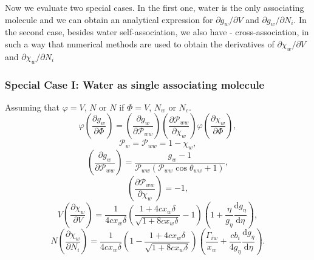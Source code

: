 Now we evaluate two special cases. In the first one, water is the only associating molecule and we can obtain an analytical expression for $\partial g_w / \partial V$ and $\partial g_w / \partial N_i$. In the second case, besides water self-association, we also have - cross-association, in such a way that numerical methods are used to obtain the derivatives of $\partial \chi_w / \partial V$ and $\partial \chi_w / \partial N_i$

\subsubsection{Special Case I: Water as single associating molecule}
Assuming that $\varphi = V$, $N$ or $N$ if $\Phi = V$, $N_w$ or $N_c$.
\begin{equation}
           \varphi \left ( \frac{\partial g_w}{\partial \Phi} \right ) = \left ( \frac{\partial g_w}{\partial \mathcal{P}_{ww}} \right ) \left ( \frac{\partial \mathcal{P}_{ww}}{\partial \chi_{w}} \right )\varphi\left ( \frac{\partial \chi_w}{\partial \Phi} \right ),
        \label{dPhidgw}
\end{equation}
\begin{equation}
        \mathcal{P}_{w} = \mathcal{P}_{ww} = 1 - \chi_w,
        \label{P_w_onlywater}
\end{equation} 
\begin{equation}
         \left ( \frac{\partial g_w}{\partial \mathcal{P}_{ww}} \right ) = \frac{g_w-1}{\mathcal{P}_{ww} \left ( \mathcal{P}_{ww} \cos{\theta_{ww}}  + 1 \right )},
        \label{dgwdPw}
\end{equation} 
\begin{equation}
         \left ( \frac{\partial \mathcal{P}_{ww}}{\partial \chi_{w}} \right ) = -1,
        \label{dPwdchi}
\end{equation} 
\begin{equation}
         V\left ( \frac{\partial \chi_w}{\partial V} \right ) = \frac{1}{4c x_w\delta}\left ( \frac{1+4c x_w\delta}{\sqrt{1+8c x_w\delta}} -1\right )\left ( 1 + \frac{\eta }{g_\eta}\frac{\mathrm{d} g_\eta}{\mathrm{d} \eta}  \right ),
        \label{dchidV}
\end{equation} 
\begin{equation}
         N\left ( \frac{\partial \chi_w}{\partial N_i} \right ) = \frac{1}{4c x_w\delta}\left ( 1-\frac{1+4c x_w\delta}{\sqrt{1+8c x_w\delta}}\right )\left ( \frac{\Gamma_{iw}}{x_w} + \frac{c b_i }{4 g_\eta}\frac{\mathrm{d} g_\eta}{\mathrm{d} \eta}  \right ).
        \label{dchidNi}
\end{equation} 



